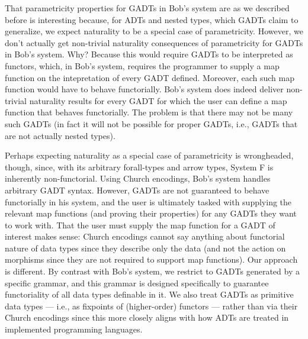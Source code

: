 \documentclass[acmsmall,screen,review,anonymous]{acmart}
\theoremstyle{definition}
\begin{document}
That parametricity properties for GADTs in Bob's system are as we
described before is interesting because, for ADTs and nested types,
which GADTs claim to generalize, we expect naturality to be a special
case of parametricity. However, we don't actually get non-trivial
naturality consequences of parametricity for GADTs in Bob's
system. Why? Because this would require GADTs to be interpreted as
functors, which, in Bob's system, requires the programmer to supply a
map function on the intepretation of every GADT defined. Moreover,
each such map function would have to behave functorially. Bob's system
does indeed deliver non-trivial naturality results for every GADT for
which the user can define a map function that behaves
functorially. The problem is that there may not be many such GADTs (in
fact it will not be possible for proper GADTs, i.e., GADTs that are
not actually nested types).








Perhaps expecting naturality as a special case of parametricity is
wrongheaded, though, since, with its arbitrary forall-types and arrow
types, System F is inherently non-functorial. Using Church encodings,
Bob's system handles arbitrary GADT syntax. However, GADTs are not
guaranteed to behave functorially in his system, and the user is
ultimately tasked with supplying the relevant map functions (and
proving their properties) for any GADTs they want to work with. That
the user must supply the map function for a GADT of interest makes
sense: Church encodings cannot say anything about functorial nature of
data types since they describe only the data (and not the action on
morphisms since they are not required to support map functions).  Our
approach is different. By contrast with Bob's system, we restrict to
GADTs generated by a specific grammar, and this grammar is designed
specifically to guarantee functoriality of all data types definable in
it. We also treat GADTs as primitive data types --- i.e., as fixpoints
of (higher-order) functors --- rather than via their Church encodings
since this more closely aligns with how ADTs are treated in
implemented programming languages.
\end{document}
